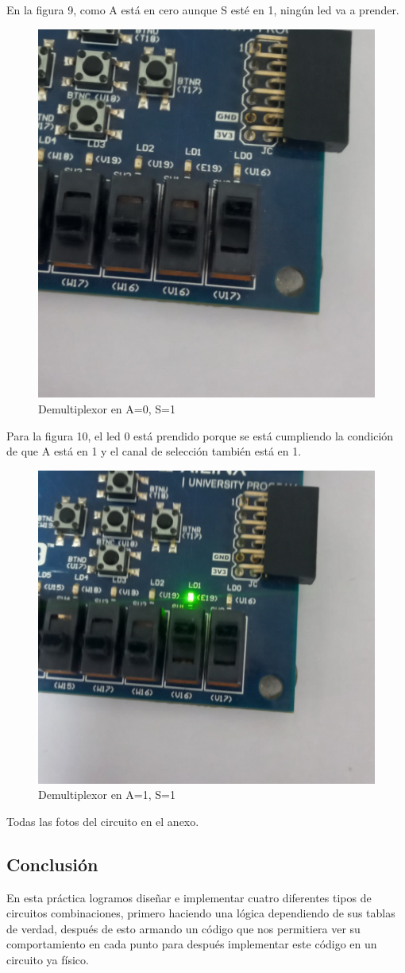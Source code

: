 \documentclass[12pt]{article}  %
\begin{document}
En la figura 9, como A está en cero aunque S esté en 1, ningún led va a prender.
\newpage
\begin{figure}[!ht]
    \centering
    \caption{Demultiplexor en A=0, S=1}
    \includegraphics[width=0.4\linewidth]{simulations/demux/demux-01.jpg}
\end{figure}

Para la figura 10, el led 0 está prendido porque se está cumpliendo la condición de que A está en 1 y el canal de selección también está en 1.

\begin{figure}[!ht]
    \centering
    \caption{Demultiplexor en A=1, S=1}
    \includegraphics[width=0.5\linewidth]{simulations/demux/demux-11.jpg}
\end{figure}
Todas las fotos del circuito en el anexo.

\subsection{Conclusión}
En esta práctica logramos diseñar e implementar cuatro diferentes tipos de circuitos combinaciones, primero haciendo una lógica dependiendo de sus tablas de verdad, después de esto armando un código que nos permitiera ver su comportamiento en cada punto para después implementar este código en un circuito ya físico.
\end{document}
